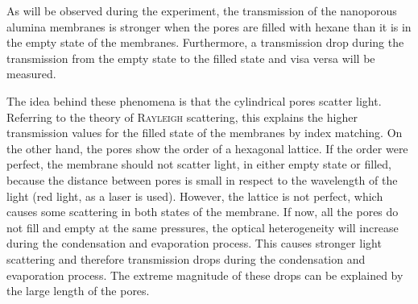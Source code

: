 \documentclass[../thesis.tex]{subfiles}
\begin{document}
      As will be observed during the experiment, the transmission of the nanoporous alumina membranes is stronger when the pores are filled with hexane than it is in the empty state of the membranes. Furthermore, a transmission drop during the transmission from the empty state to the filled state and visa versa will be measured.

      The idea behind these phenomena is that the cylindrical pores scatter light. Referring to the theory of \textsc{Rayleigh} scattering, this explains the higher transmission values for the filled state of the membranes by index matching. On the other hand, the pores show the order of a hexagonal lattice. If the order were perfect, the membrane should not scatter light, in either empty state or filled, because the distance between pores is small in respect to the wavelength of the light (red light, as a  laser is used). However, the lattice is not perfect, which causes some scattering in both states of the membrane. If now, all the pores do not fill and empty at the same pressures, the optical heterogeneity will increase during the condensation and evaporation process. This causes stronger light scattering and therefore transmission drops during the condensation and evaporation process. The extreme magnitude of these drops can be explained by the large length of the pores.
\end{document}
